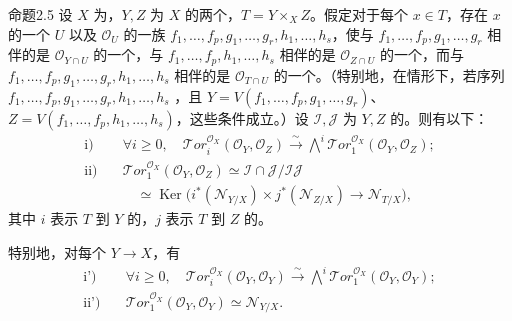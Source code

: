 \begin{SGAresult}{命题}{2.5}
设 $X$ 为，$Y,Z$ 为 $X$ 的两个，$T=Y\times_X Z$。假定对于每个 $x\in T$，存在 $x$ 的一个
$U$ 以及 $\mathcal O_U$ 的一族 $f_1,\ldots,f_p,g_1,\ldots,g_r,h_1,\ldots,h_s$，使与 $f_1,\ldots,f_p,g_1,\ldots,g_r$ 相伴的是 $\mathcal O_{Y\cap U}$ 的一个，与 $f_1,\ldots,f_p,h_1,\ldots,h_s$ 相伴的是 $\mathcal O_{Z\cap U}$ 的一个，而与 $f_1,\ldots,f_p,g_1,\ldots,g_r,h_1,\ldots,h_s$ 相伴的是 $\mathcal O_{T\cap U}$ 的一个。（特别地，在情形下，若序列 $f_1,\ldots,f_p,g_1,\ldots,g_r,h_1,\ldots,h_s$ ，且 $Y=V(f_1,\ldots,f_p,g_1,\ldots,g_r)$、$Z=V(f_1,\ldots,f_p,h_1,\ldots,h_s)$，这些条件成立。）设 $\mathcal I,\mathcal J$ 为 $Y,Z$ 的。则有以下：
\[
\begin{aligned}
\text{i)}\quad&\forall i\geq0,\quad
\mathcal{T}or_i^{\mathcal O_X}(\mathcal O_Y,\mathcal O_Z)
\xrightarrow{\sim}\bigwedge^i\mathcal{T}or_1^{\mathcal O_X}(\mathcal O_Y,\mathcal O_Z);\\
\text{ii)}\quad&\mathcal{T}or_1^{\mathcal O_X}(\mathcal O_Y,\mathcal O_Z)
\simeq\mathcal I\cap\mathcal J/\mathcal I\mathcal J\\
&\hspace{1em}\simeq\operatorname{Ker}\bigl(i^*(\mathcal N_{Y/X})\times j^*(\mathcal N_{Z/X})\longrightarrow\mathcal N_{T/X}\bigr),
\end{aligned}
\]
其中 $i$ 表示 $T$ 到 $Y$ 的，$j$ 表示 $T$ 到 $Z$ 的。

特别地，对每个 $Y\to X$，有
\[
\begin{aligned}
\text{i')}\quad&\forall i\geq0,\quad\mathcal{T}or_i^{\mathcal O_X}(\mathcal O_Y,\mathcal O_Y)
\xrightarrow{\sim}\bigwedge^i\mathcal{T}or_1^{\mathcal O_X}(\mathcal O_Y,\mathcal O_Y);\\
\text{ii')}\quad&\mathcal{T}or_1^{\mathcal O_X}(\mathcal O_Y,\mathcal O_Y)\simeq\mathcal N_{Y/X}.
\end{aligned}
\]
\end{SGAresult}

